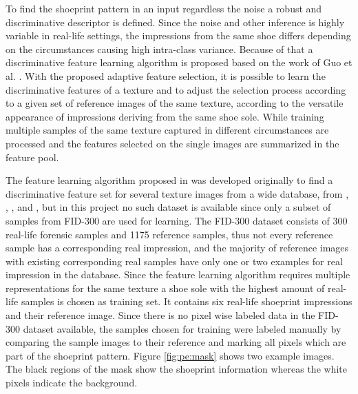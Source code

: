 \documentclass[draft,final]{vutinfth} %
\begin{document}
\par
To find the shoeprint pattern in an input regardless the noise a robust and discriminative descriptor is defined.
Since the noise and other inference is highly variable in real-life settings, the impressions from the same shoe differs depending on the circumstances causing high intra-class variance.
Because of that a discriminative feature learning algorithm is proposed based on the work of Guo et al. \cite{guo2012discriminative}.
With the proposed adaptive feature selection, it is possible to learn the discriminative features of a texture and to adjust the selection process according to a given set of reference images of the same texture, according to the versatile appearance of impressions deriving from the same shoe sole.
While training multiple samples of the same texture captured in different circumstances are processed and the features selected on the single images are summarized in the feature pool.
\par
The feature learning algorithm proposed in \cite{guo2012discriminative} was developed originally to find a discriminative feature set for several texture images from a wide database, from \cite{ojala2002outex}, \cite{dana1999reflectance}, \cite{boland2001neural}, \cite{jantzen2005pap} and \cite{brahnam2007introduction}, but in this project no such dataset is available since only a subset of samples from FID-300 are used for learning. 
The FID-300 \cite{kortylewski2014unsupervised} dataset consists of 300 real-life forensic samples and 1175 reference samples, thus not every reference sample has a corresponding real impression, and the majority of reference images with existing corresponding real samples have only one or two examples for real impression in the database.
Since the feature learning algorithm requires multiple representations for the same texture a shoe sole with the highest amount of real-life samples is chosen as training set.
It contains six real-life shoeprint impressions and their reference image. 
Since there is no pixel wise labeled data in the FID-300 dataset available, the samples chosen for training were labeled manually by comparing the sample images to their reference and marking all pixels which are part of the shoeprint pattern.
Figure \ref{fig:pe:mask} shows two example images. 
The black regions of the mask show the shoeprint information whereas the white pixels indicate the background.
\end{document}
